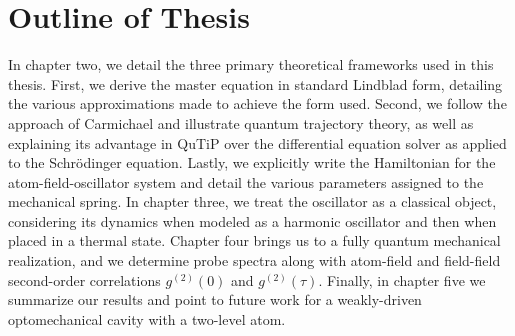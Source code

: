 \section{Outline of Thesis}
In chapter two, we detail the three primary theoretical frameworks used in this thesis. First, we derive the master equation in standard Lindblad form, detailing the various approximations made to achieve the form used. Second, we follow the approach of Carmichael and illustrate quantum trajectory theory, as well as explaining its advantage in QuTiP over the differential equation solver as applied to the Schr\"{o}dinger equation. Lastly, we explicitly write the Hamiltonian for the atom-field-oscillator system and detail the various parameters assigned to the mechanical spring. In chapter three, we treat the oscillator as a classical object, considering its dynamics when modeled as a harmonic oscillator and then when placed in a thermal state. Chapter four brings us to a fully quantum mechanical realization, and we determine probe spectra along with atom-field and field-field second-order correlations $g^{(2)}(0)$ and $g^{(2)}(\tau)$. Finally, in chapter five we summarize our results and point to future work for a weakly-driven optomechanical cavity with a two-level atom.